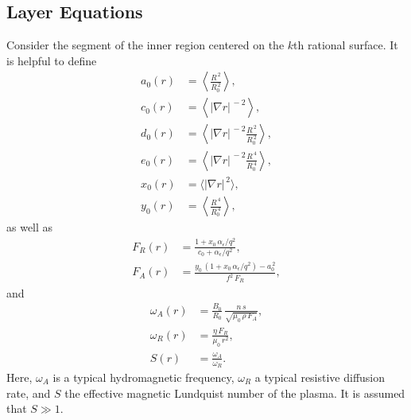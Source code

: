 \documentclass[12pt,prb,aps,notitlepage]{revtex4-1}
\begin{document}
\subsection{Layer Equations}
Consider the segment of the inner region centered on the $k$th rational surface. It is helpful to
define
\begin{align}
a_0(r)&= \left\langle \frac{R^{\,2}}{R_0^{\,2}}\right\rangle,\\[0.5ex]
c_0(r) &= \left\langle |\nabla r|^{\,-2}\right\rangle,\\[0.5ex]
d_0(r) &= \left\langle |\nabla r|^{\,-2}\frac{R^{\,2}}{R_0^{\,2}}\right\rangle,\\[0.5ex]
e_0(r)&=\left\langle |\nabla r|^{\,-2}\frac{R^{\,4}}{R_0^{\,4}}\right\rangle,\\[0.5ex]
x_0(r) &= \langle |\nabla r|^{\,2}\rangle,\\[0.5ex]
y_0(r) &= \left\langle\frac{R^{\,4}}{R_0^{\,4}}\right\rangle,
\end{align}
as well as 
\begin{align}
F_R(r) &= \frac{1+x_0\,\alpha_\epsilon/q^2}{c_0+\alpha_\epsilon/q^2},\\[0.5ex]
F_A(r) &= \frac{y_0\,(1+x_0\,\alpha_\epsilon/q^2)-a_0^{\,2}}{f^2\,F_R},
\end{align}
and
\begin{align}
\omega_A(r) &=\frac{B_0}{R_0}\,\frac{n\,s}{\sqrt{\mu_0\,\rho\,F_A}},\\[0.5ex]
\omega_R(r) &= \frac{\eta\,F_R}{\mu_0\,r^2},\\[0.5ex]
S(r) &= \frac{\omega_A}{\omega_R}.
\end{align}
Here, $\omega_A$ is a typical hydromagnetic frequency, $\omega_R$ a typical resistive diffusion rate, and
$S$ the effective magnetic Lundquist number of the plasma. It is assumed that $S\gg 1$. 
\end{document}
